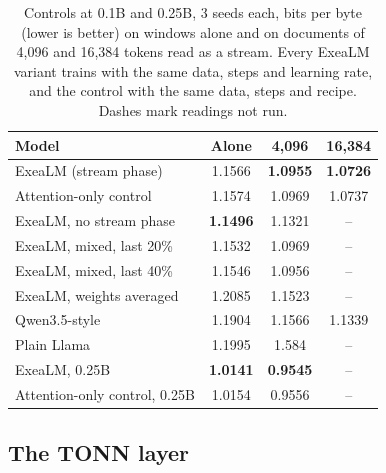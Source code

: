 \documentclass[10pt,twocolumn,letterpaper]{article}
\begin{document}
\begin{table}[t]
\centering\small
\caption{Controls at 0.1B and 0.25B, 3 seeds each, bits per byte (lower is better) on windows alone and on documents of 4,096 and 16,384 tokens read as a stream. Every ExeaLM variant trains with the same data, steps and learning rate, and the control with the same data, steps and recipe. Dashes mark readings not run.}
\label{tab:parts}
\setlength{\tabcolsep}{3pt}
\begin{tabular}{@{}l ccc@{}}
\toprule
Model & Alone & 4,096 & 16,384 \\
\midrule
ExeaLM (stream phase) & 1.1566 & \textbf{1.0955} & \textbf{1.0726} \\
Attention-only control & 1.1574 & 1.0969 & 1.0737 \\
ExeaLM, no stream phase & \textbf{1.1496} & 1.1321 & -- \\
ExeaLM, mixed, last 20\% & 1.1532 & 1.0969 & -- \\
ExeaLM, mixed, last 40\% & 1.1546 & 1.0956 & -- \\
ExeaLM, weights averaged & 1.2085 & 1.1523 & -- \\
Qwen3.5-style & 1.1904 & 1.1566 & 1.1339 \\
Plain Llama & 1.1995 & 1.584 & -- \\
\midrule
ExeaLM, 0.25B & \textbf{1.0141} & \textbf{0.9545} & -- \\
Attention-only control, 0.25B & 1.0154 & 0.9556 & -- \\
\bottomrule
\end{tabular}
\end{table}

\subsection{The TONN layer}
\end{document}
